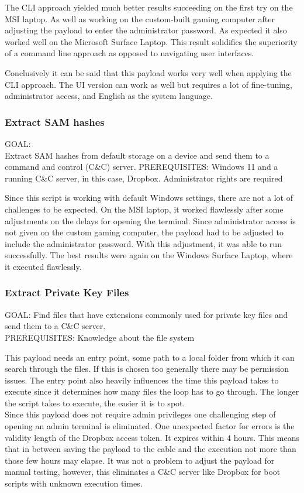 The CLI approach yielded much better results succeeding on the first try on the MSI laptop. As well as working on the custom-built gaming computer after adjusting the payload to enter the administrator password. As expected it also worked well on the Microsoft Surface Laptop. This result solidifies the superiority of a command line approach as opposed to navigating user interfaces. 


Conclusively it can be said that this payload works very well when applying the CLI approach. The UI version can work as well but requires a lot of fine-tuning, administrator access, and English as the system language. 



\subsubsection{Extract SAM hashes}

GOAL:\\ Extract SAM hashes from default storage on a device and send them to a command and control (C\&C) server.
PREREQUISITES: Windows 11 and a running C\&C server, in this case, Dropbox. Administrator rights are required

Since this script is working with default Windows settings, there are not a lot of challenges to be expected. On the MSI laptop, it worked flawlessly after some adjustments on the delays for opening the terminal. Since administrator access is not given on the custom gaming computer, the payload had to be adjusted to include the administrator password. With this adjustment, it was able to run successfully. The best results were again on the Windows Surface Laptop, where it executed flawlessly. 


\subsubsection{Extract Private Key Files}

GOAL: Find files that have extensions commonly used for private key files and send them to a C\&C server. \\
PREREQUISITES: Knowledge about the file system

This payload needs an entry point, some path to a local folder from which it can search through the files. If this is chosen too generally there may be permission issues. The entry point also heavily influences the time this payload takes to execute since it determines how many files the loop has to go through. The longer the script takes to execute, the easier it is to spot. \\
Since this payload does not require admin privileges one challenging step of opening an admin terminal is eliminated. One unexpected factor for errors is the validity length of the Dropbox access token. It expires within 4 hours. This means that in between saving the payload to the cable and the execution not more than those few hours may elapse. It was not a problem to adjust the payload for manual testing, however, this eliminates a C\&C server like Dropbox for boot scripts with unknown execution times. \\

